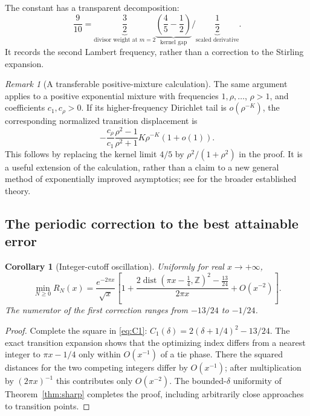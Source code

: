 \documentclass[11pt]{article}
\numberwithin{equation}{section}
\newtheorem{corollary}[theorem]{Corollary}
\theoremstyle{definition}
\theoremstyle{remark}
\newtheorem{remark}[theorem]{Remark}
\newcommand{\Z}{\mathbb Z}
\DeclareMathOperator{\dist}{dist}
\begin{document}
The constant has a transparent decomposition:
\[
 \frac9{10}
 =\underbrace{\frac32}_{\text{divisor weight at }m=2}
  \underbrace{\left(\frac45-\frac12\right)}_{\text{kernel gap}}
  \bigg/\underbrace{\frac12}_{\text{scaled derivative}}.
\]
It records the second Lambert frequency, rather than a correction to
the Stirling expansion.

\begin{remark}[A transferable positive-mixture calculation]
The same argument applies to a positive exponential mixture with
frequencies $1,\rho,\ldots$, $\rho>1$, and coefficients $c_1,c_\rho>0$.
If its higher-frequency Dirichlet tail is $o(\rho^{-K})$, the
corresponding normalized transition displacement is
\[
 -\frac{c_\rho}{c_1}\frac{\rho^2-1}{\rho^2+1}
                 K\rho^{-K}(1+o(1)).
\]
This follows by replacing the kernel limit $4/5$ by
$\rho^2/(1+\rho^2)$ in the proof. It is a useful extension of the
calculation, rather than a claim to a new general method of
exponentially improved asymptotics; see \cite[\S2.11]{DLMF} for
the broader established theory.
\end{remark}

\subsection{The periodic correction to the best attainable error}

\begin{corollary}[Integer-cutoff oscillation]\label{cor:lattice}
Uniformly for real $x\to+\infty$,
\begin{equation}\label{eq:minimum-R}
 \min_{N\ge0}R_N(x)
 =\frac{e^{-2\pi x}}{\sqrt{x}}
 \left[
 1+\frac{2\dist(\pi x-\tfrac14,\Z)^2-\tfrac{13}{24}}{2\pi x}
 +O(x^{-2})
 \right].
\end{equation}
The numerator of the first correction ranges from $-13/24$ to
$-1/24$.
\end{corollary}
\begin{proof}
Complete the square in \eqref{eq:C1}:
$C_1(\delta)=2(\delta+1/4)^2-13/24$.
The exact transition expansion shows that the optimizing index
differs from a nearest integer to $\pi x-1/4$ only within
$O(x^{-1})$ of a tie phase. There the squared distances for the
two competing integers differ by $O(x^{-1})$; after multiplication
by $(2\pi x)^{-1}$ this contributes only $O(x^{-2})$.
The bounded-$\delta$ uniformity of Theorem~\ref{thm:sharp} completes
the proof, including arbitrarily close approaches to transition points.
\end{proof}
\end{document}
